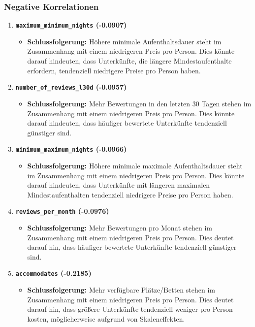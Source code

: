 \documentclass[
  journal,
]{IEEEtran}%
\providecommand{\tightlist}{%
  \setlength{\itemsep}{0pt}\setlength{\parskip}{0pt}}\usepackage{longtable,booktabs,array}
\begin{document}
\subsubsection{Negative Korrelationen}\label{negative-korrelationen-2}

\begin{enumerate}
\def\labelenumi{\arabic{enumi}.}
\item
  \textbf{\texttt{maximum\_minimum\_nights} (-0.0907)}

  \begin{itemize}
  \tightlist
  \item
    \textbf{Schlussfolgerung:} Höhere minimale Aufenthaltsdauer steht im
    Zusammenhang mit einem niedrigeren Preis pro Person. Dies könnte
    darauf hindeuten, dass Unterkünfte, die längere Mindestaufenthalte
    erfordern, tendenziell niedrigere Preise pro Person haben.
  \end{itemize}
\item
  \textbf{\texttt{number\_of\_reviews\_l30d} (-0.0957)}

  \begin{itemize}
  \tightlist
  \item
    \textbf{Schlussfolgerung:} Mehr Bewertungen in den letzten 30 Tagen
    stehen im Zusammenhang mit einem niedrigeren Preis pro Person. Dies
    könnte darauf hindeuten, dass häufiger bewertete Unterkünfte
    tendenziell günstiger sind.
  \end{itemize}
\item
  \textbf{\texttt{minimum\_maximum\_nights} (-0.0966)}

  \begin{itemize}
  \tightlist
  \item
    \textbf{Schlussfolgerung:} Höhere minimale maximale Aufenthaltsdauer
    steht im Zusammenhang mit einem niedrigeren Preis pro Person. Dies
    könnte darauf hindeuten, dass Unterkünfte mit längeren maximalen
    Mindestaufenthalten tendenziell niedrigere Preise pro Person haben.
  \end{itemize}
\item
  \textbf{\texttt{reviews\_per\_month} (-0.0976)}

  \begin{itemize}
  \tightlist
  \item
    \textbf{Schlussfolgerung:} Mehr Bewertungen pro Monat stehen im
    Zusammenhang mit einem niedrigeren Preis pro Person. Dies deutet
    darauf hin, dass häufiger bewertete Unterkünfte tendenziell
    günstiger sind.
  \end{itemize}
\item
  \textbf{\texttt{accommodates} (-0.2185)}

  \begin{itemize}
  \tightlist
  \item
    \textbf{Schlussfolgerung:} Mehr verfügbare Plätze/Betten stehen im
    Zusammenhang mit einem niedrigeren Preis pro Person. Dies deutet
    darauf hin, dass größere Unterkünfte tendenziell weniger pro Person
    kosten, möglicherweise aufgrund von Skaleneffekten.
  \end{itemize}
\end{enumerate}
\end{document}
